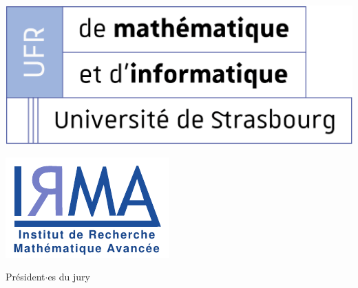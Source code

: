{\begin{minipage}[c]{6in}
\begin{minipage}[c]{1.5in}
    \end{minipage}
    \hfill
    \hfill
    \begin{minipage}[c]{1.5in}
        \includegraphics[width=\linewidth]{logos/logo-ufr.png}
    \end{minipage}
    \hfill
    \begin{minipage}[c]{1.5in}
        \includegraphics[width=\linewidth]{logos/logo-irma.pdf}
    \end{minipage}
    \hfill
\end{minipage}
%
\hfill
%
\begin{minipage}[c]{2.8in}
    \sigskip \signature{}{\vspace{3pt}Président$\cdot$es du jury}
\end{minipage}}